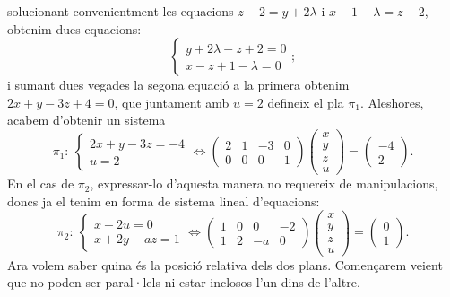 \documentclass[11pt]{article}
\begin{document}
solucionant convenientment les equacions $z-2=y+2\lambda$ i $x-1-\lambda=z-2$, obtenim dues equacions:
\begin{equation}
\begin{cases}y+2\lambda-z+2=0\\ x-z+1-\lambda=0\end{cases};
\end{equation}
i sumant dues vegades la segona equació a la primera obtenim $2x+y-3z+4=0$, que juntament amb $u=2$ defineix el pla $\pi_1$. Aleshores, acabem d'obtenir un sistema
\begin{equation}
\pi_1:\ \begin{cases} 2x+y-3z=-4\\ u=2\end{cases}\iff\begin{pmatrix}
2 & 1 & -3 & 0\\
0 & 0 & 0 & 1
\end{pmatrix}\begin{pmatrix}x\\ y\\ z\\ u\end{pmatrix}=\begin{pmatrix}-4\\ 2\end{pmatrix}.
\end{equation}
En el cas de $\pi_2$, expressar-lo d'aquesta manera no requereix de manipulacions, doncs ja el tenim en forma de sistema lineal d'equacions:
\begin{equation}
\pi_2:\ \begin{cases} x-2u=0\\ x+2y-az=1\end{cases}\iff\begin{pmatrix}
1 & 0 & 0 & -2\\
1 & 2 & -a & 0
\end{pmatrix}\begin{pmatrix}x\\ y\\ z\\ u\end{pmatrix}=\begin{pmatrix}0\\ 1\end{pmatrix}.
\end{equation}
Ara volem saber quina és la posició relativa dels dos plans. Començarem veient que no poden ser paral·lels ni estar inclosos l'un dins de l'altre.\\
\end{document}
